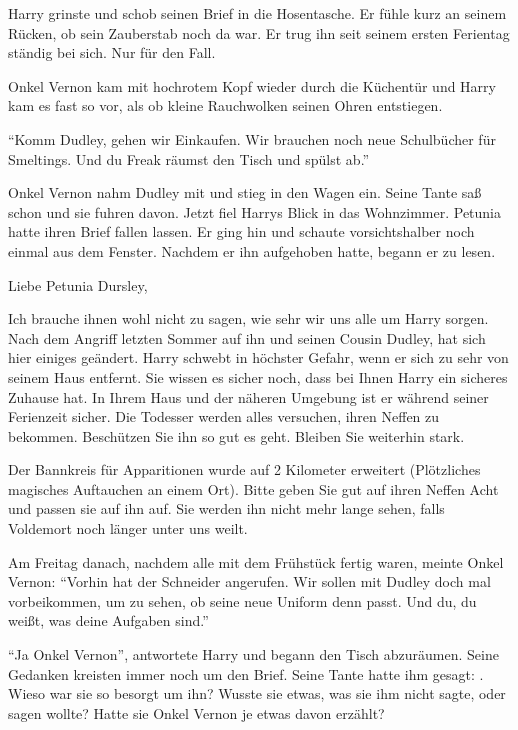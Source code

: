 Harry grinste und schob seinen Brief in die Hosentasche. Er fühle kurz an seinem Rücken, ob sein Zauberstab noch da war. Er trug ihn seit seinem ersten Ferientag ständig bei sich. Nur für den Fall.

Onkel Vernon kam mit hochrotem Kopf wieder durch die Küchentür und Harry kam es fast so vor, als ob kleine Rauchwolken seinen Ohren entstiegen. 

\enquote{Komm Dudley, gehen wir Einkaufen. Wir brauchen noch neue Schulbücher für Smeltings. Und du Freak räumst den Tisch und spülst ab.}

Onkel Vernon nahm Dudley mit und stieg in den Wagen ein. Seine Tante saß schon und sie fuhren davon. Jetzt fiel Harrys Blick in das Wohnzimmer. Petunia hatte ihren Brief fallen lassen. Er ging hin und schaute vorsichtshalber noch einmal aus dem Fenster. Nachdem er ihn aufgehoben hatte, begann er zu lesen.

\begin{brief}
Liebe Petunia Dursley,

Ich brauche ihnen wohl nicht zu sagen, wie sehr wir uns alle um Harry sorgen. Nach dem Angriff letzten Sommer auf ihn und seinen Cousin Dudley, hat sich hier einiges geändert. Harry schwebt in höchster Gefahr, wenn er sich zu sehr von seinem Haus entfernt. Sie wissen es sicher noch, dass bei Ihnen Harry ein sicheres Zuhause hat. In Ihrem Haus und der näheren Umgebung ist er während seiner Ferienzeit sicher. Die Todesser werden alles versuchen, ihren Neffen zu bekommen. Beschützen Sie ihn so gut es geht. Bleiben Sie weiterhin stark.

Der Bannkreis für Apparitionen wurde auf 2 Kilometer erweitert (Plötzliches magisches Auftauchen an einem Ort). Bitte geben Sie gut auf ihren Neffen Acht und passen sie auf ihn auf. Sie werden ihn nicht mehr lange sehen, falls Voldemort noch länger unter uns weilt.
\end{brief}

Am Freitag danach, nachdem alle mit dem Frühstück fertig waren, meinte Onkel Vernon: \enquote{Vorhin hat der Schneider angerufen. Wir sollen mit Dudley doch mal vorbeikommen, um zu sehen, ob seine neue Uniform denn passt. Und du, du weißt, was deine Aufgaben sind.}

\enquote{Ja Onkel Vernon}, antwortete Harry und begann den Tisch abzuräumen. Seine Gedanken kreisten immer noch um den Brief. Seine Tante hatte ihm gesagt: . Wieso war sie so besorgt um ihn? Wusste sie etwas, was sie ihm nicht sagte, oder sagen wollte? Hatte sie Onkel Vernon je etwas davon erzählt?

